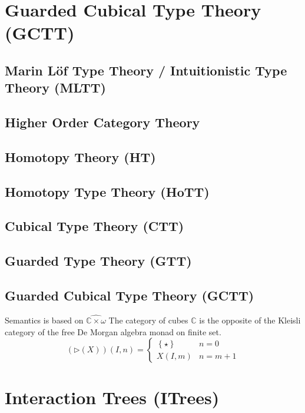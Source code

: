 \documentclass[twoside,11pt,openright]{report}
\newcommand*{\set}[1]{\left\{#1\right\}}
\begin{document}
\chapter{Guarded Cubical Type Theory (GCTT)}
\label{ch:itree}

\section{Marin L\"of Type Theory / Intuitionistic Type Theory (MLTT)}

\section{Higher Order Category Theory}

\section{Homotopy Theory (HT)}

\section{Homotopy Type Theory (HoTT)}

\section{Cubical Type Theory (CTT)}

\section{Guarded Type Theory (GTT)}

\section{Guarded Cubical Type Theory (GCTT)}
Semantics is based on \(\widehat{\mathbb{C} \times \omega}\) The category of cubes \(\mathbb{C}\) is the opposite of the Kleisli category of the free De Morgan algebra monad on finite set.
\begin{equation}
  (\triangleright(X))(I,n) = \begin{cases} \set{\star} & n = 0 \\ X(I,m) & n = m + 1 \end{cases}
\end{equation}



\chapter{Interaction Trees (ITrees)}
\label{ch:itree}
\end{document}
